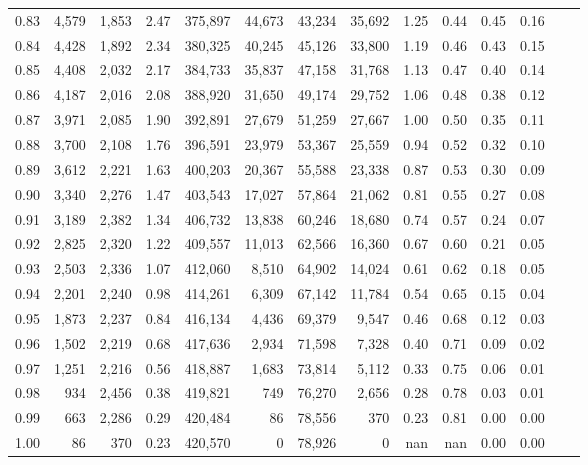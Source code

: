 \begin{tabular}{rrrrrrrrrrrrrr}
0.83 &  4,579 &  1,853 &    2.47 &  375,897 &   44,673 &  43,234 &  35,692 &  1.25 &  0.44 &  0.45 &      0.16 \\
0.84 &  4,428 &  1,892 &    2.34 &  380,325 &   40,245 &  45,126 &  33,800 &  1.19 &  0.46 &  0.43 &      0.15 \\
0.85 &  4,408 &  2,032 &    2.17 &  384,733 &   35,837 &  47,158 &  31,768 &  1.13 &  0.47 &  0.40 &      0.14 \\
0.86 &  4,187 &  2,016 &    2.08 &  388,920 &   31,650 &  49,174 &  29,752 &  1.06 &  0.48 &  0.38 &      0.12 \\
0.87 &  3,971 &  2,085 &    1.90 &  392,891 &   27,679 &  51,259 &  27,667 &  1.00 &  0.50 &  0.35 &      0.11 \\
0.88 &  3,700 &  2,108 &    1.76 &  396,591 &   23,979 &  53,367 &  25,559 &  0.94 &  0.52 &  0.32 &      0.10 \\
0.89 &  3,612 &  2,221 &    1.63 &  400,203 &   20,367 &  55,588 &  23,338 &  0.87 &  0.53 &  0.30 &      0.09 \\
0.90 &  3,340 &  2,276 &    1.47 &  403,543 &   17,027 &  57,864 &  21,062 &  0.81 &  0.55 &  0.27 &      0.08 \\
0.91 &  3,189 &  2,382 &    1.34 &  406,732 &   13,838 &  60,246 &  18,680 &  0.74 &  0.57 &  0.24 &      0.07 \\
0.92 &  2,825 &  2,320 &    1.22 &  409,557 &   11,013 &  62,566 &  16,360 &  0.67 &  0.60 &  0.21 &      0.05 \\
0.93 &  2,503 &  2,336 &    1.07 &  412,060 &    8,510 &  64,902 &  14,024 &  0.61 &  0.62 &  0.18 &      0.05 \\
0.94 &  2,201 &  2,240 &    0.98 &  414,261 &    6,309 &  67,142 &  11,784 &  0.54 &  0.65 &  0.15 &      0.04 \\
0.95 &  1,873 &  2,237 &    0.84 &  416,134 &    4,436 &  69,379 &   9,547 &  0.46 &  0.68 &  0.12 &      0.03 \\
0.96 &  1,502 &  2,219 &    0.68 &  417,636 &    2,934 &  71,598 &   7,328 &  0.40 &  0.71 &  0.09 &      0.02 \\
0.97 &  1,251 &  2,216 &    0.56 &  418,887 &    1,683 &  73,814 &   5,112 &  0.33 &  0.75 &  0.06 &      0.01 \\
0.98 &    934 &  2,456 &    0.38 &  419,821 &      749 &  76,270 &   2,656 &  0.28 &  0.78 &  0.03 &      0.01 \\
0.99 &    663 &  2,286 &    0.29 &  420,484 &       86 &  78,556 &     370 &  0.23 &  0.81 &  0.00 &      0.00 \\
1.00 &     86 &    370 &    0.23 &  420,570 &        0 &  78,926 &       0 &   nan &   nan &  0.00 &      0.00 \\
\bottomrule
\end{tabular}
